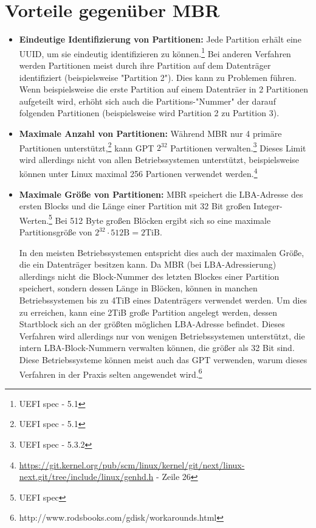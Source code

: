 \section{Vorteile gegenüber MBR}
\label{sec:gpt_advantages}

\begin{itemize}
    \item \textbf{Eindeutige Identifizierung von Partitionen:} 
    Jede Partition erhält eine UUID, um sie eindeutig identifizieren zu können.\footnote{UEFI spec - 5.1}
    Bei anderen Verfahren werden Partitionen meist durch ihre Partition auf dem Datenträger identifiziert (beispielsweise "Partition 2").
    Dies kann zu Problemen führen. 
    Wenn beispielsweise die erste Partition auf einem Datenträer in 2 Partitionen aufgeteilt wird, erhöht sich auch die Partitions-"Nummer" der darauf folgenden Partitionen (beispielsweise wird Partition 2 zu Partition 3).

    \item \textbf{Maximale Anzahl von Partitionen:}
    Während MBR nur 4 primäre Partitionen unterstützt,\footnote{UEFI spec - 5.1} kann GPT $ 2^{32} $ Partitionen verwalten.\footnote{UEFI spec - 5.3.2}
    Dieses Limit wird allerdings nicht von allen Betriebssystemen unterstützt, beispielsweise können unter Linux maximal 256 Partionen verwendet werden.\footnote{\url{https://git.kernel.org/pub/scm/linux/kernel/git/next/linux-next.git/tree/include/linux/genhd.h} - Zeile 26}

    \item \textbf{Maximale Größe von Partitionen:}
    MBR speichert die LBA-Adresse des ersten Blocks und die Länge einer Partition mit 32 Bit großen Integer-Werten.\footnote{UEFI spec}
    Bei 512 Byte großen Blöcken ergibt sich so eine maximale Partitionsgröße von $ 2^{32} \cdot 512 \mathrm{B} = 2 \mathrm{TiB} $.

    In den meisten Betriebssystemen entspricht dies auch der maximalen Größe, die ein Datenträger besitzen kann.
    Da MBR (bei LBA-Adressierung) allerdings nicht die Block-Nummer des letzten Blockes einer Partition speichert, sondern dessen Länge in Blöcken, können in manchen Betriebssystemen bis zu 4TiB eines Datenträgers verwendet werden. 
    Um dies zu erreichen, kann eine 2TiB große Partition angelegt werden, dessen Startblock sich an der größten möglichen LBA-Adresse befindet.
    Dieses Verfahren wird allerdings nur von wenigen Betriebssystemen unterstützt, die intern LBA-Block-Nummern verwalten können, die größer als 32 Bit sind.
    Diese Betriebssysteme können meist auch das GPT verwenden, warum dieses Verfahren in der Praxis selten angewendet wird.\footnote{http://www.rodsbooks.com/gdisk/workarounds.html}


\end{itemize}
